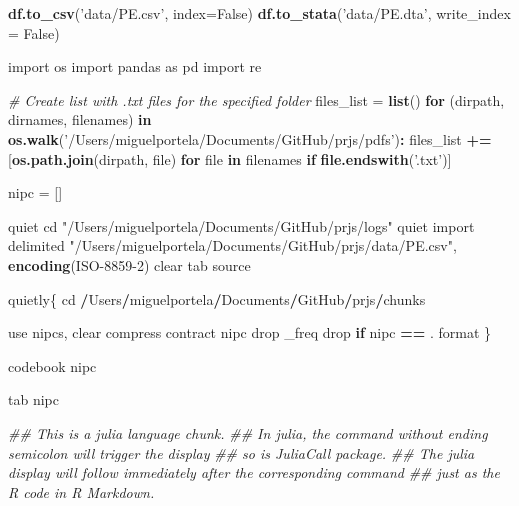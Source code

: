 \documentclass[
  12pt,
]{article}
\newenvironment{Shaded}{\begin{snugshade}}{\end{snugshade}}
\newcommand{\CommentTok}[1]{\textcolor[rgb]{0.56,0.35,0.01}{\textit{#1}}}
\newcommand{\ControlFlowTok}[1]{\textcolor[rgb]{0.13,0.29,0.53}{\textbf{#1}}}
\newcommand{\DataTypeTok}[1]{\textcolor[rgb]{0.13,0.29,0.53}{#1}}
\newcommand{\DecValTok}[1]{\textcolor[rgb]{0.00,0.00,0.81}{#1}}
\newcommand{\ErrorTok}[1]{\textcolor[rgb]{0.64,0.00,0.00}{\textbf{#1}}}
\newcommand{\FloatTok}[1]{\textcolor[rgb]{0.00,0.00,0.81}{#1}}
\newcommand{\KeywordTok}[1]{\textcolor[rgb]{0.13,0.29,0.53}{\textbf{#1}}}
\newcommand{\NormalTok}[1]{#1}
\newcommand{\OperatorTok}[1]{\textcolor[rgb]{0.81,0.36,0.00}{\textbf{#1}}}
\newcommand{\StringTok}[1]{\textcolor[rgb]{0.31,0.60,0.02}{#1}}
\begin{document}
\begin{Shaded}
\begin{Highlighting}[]
\KeywordTok{df.to_csv}\NormalTok{(}\StringTok{'data/PE.csv'}\NormalTok{, }\DataTypeTok{index=}\NormalTok{False)}
\KeywordTok{df.to_stata}\NormalTok{(}\StringTok{'data/PE.dta'}\NormalTok{, }\DataTypeTok{write_index =}\NormalTok{ False)}

\NormalTok{import os}
\NormalTok{import pandas as pd}
\NormalTok{import re}

\CommentTok{# Create list with .txt files for the specified folder}
\NormalTok{files_list =}\StringTok{ }\KeywordTok{list}\NormalTok{()}
\ControlFlowTok{for}\NormalTok{ (dirpath, dirnames, filenames) }\ControlFlowTok{in} \KeywordTok{os.walk}\NormalTok{(}\StringTok{'/Users/miguelportela/Documents/GitHub/prjs/pdfs'}\NormalTok{)}\OperatorTok{:}
\StringTok{    }\NormalTok{files_list }\OperatorTok{+}\ErrorTok{=}\StringTok{ }\NormalTok{[}\KeywordTok{os.path.join}\NormalTok{(dirpath, file) }\ControlFlowTok{for}\NormalTok{ file }\ControlFlowTok{in}\NormalTok{ filenames }\ControlFlowTok{if} \KeywordTok{file.endswith}\NormalTok{(}\StringTok{'.txt'}\NormalTok{)]}
    

\NormalTok{nipc =}\StringTok{ }\NormalTok{[]}


\NormalTok{quiet cd }\StringTok{"/Users/miguelportela/Documents/GitHub/prjs/logs"}
\NormalTok{quiet import delimited }\StringTok{"/Users/miguelportela/Documents/GitHub/prjs/data/PE.csv"}\NormalTok{, }\KeywordTok{encoding}\NormalTok{(ISO}\DecValTok{-8859-2}\NormalTok{) clear }
\NormalTok{tab source}


\NormalTok{quietly\{}
\NormalTok{cd }\OperatorTok{/}\NormalTok{Users}\OperatorTok{/}\NormalTok{miguelportela}\OperatorTok{/}\NormalTok{Documents}\OperatorTok{/}\NormalTok{GitHub}\OperatorTok{/}\NormalTok{prjs}\OperatorTok{/}\NormalTok{chunks}

\NormalTok{use nipcs, clear}
\NormalTok{compress}
\NormalTok{contract nipc}
\NormalTok{drop _freq}
\NormalTok{drop }\ControlFlowTok{if}\NormalTok{ nipc }\OperatorTok{==}\StringTok{ }\NormalTok{.}
\NormalTok{format %
\NormalTok{\}}

\NormalTok{codebook nipc}

\NormalTok{tab nipc}


\CommentTok{## This is a julia language chunk.}
\CommentTok{## In julia, the command without ending semicolon will trigger the display}
\CommentTok{## so is JuliaCall package.}
\CommentTok{## The julia display will follow immediately after the corresponding command}
\CommentTok{## just as the R code in R Markdown.}

}
\end{Highlighting}
\end{Shaded}
\end{document}
